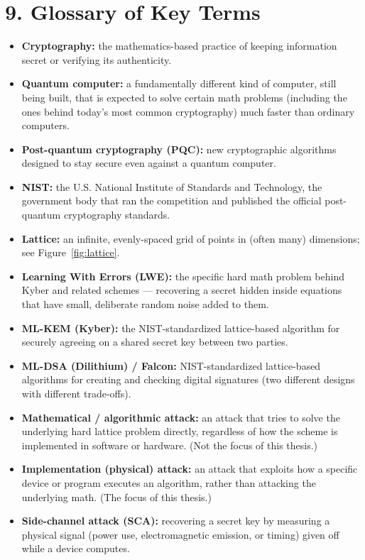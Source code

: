 \documentclass[11pt,a4paper]{article}
\begin{document}
\section*{9. Glossary of Key Terms}
\begin{itemize}[leftmargin=*]
  \item \textbf{Cryptography:} the mathematics-based practice of keeping information secret or verifying its authenticity.
  \item \textbf{Quantum computer:} a fundamentally different kind of computer, still being built, that is expected to solve certain math problems (including the ones behind today's most common cryptography) much faster than ordinary computers.
  \item \textbf{Post-quantum cryptography (PQC):} new cryptographic algorithms designed to stay secure even against a quantum computer.
  \item \textbf{NIST:} the U.S. National Institute of Standards and Technology, the government body that ran the competition and published the official post-quantum cryptography standards.
  \item \textbf{Lattice:} an infinite, evenly-spaced grid of points in (often many) dimensions; see Figure~\ref{fig:lattice}.
  \item \textbf{Learning With Errors (LWE):} the specific hard math problem behind Kyber and related schemes --- recovering a secret hidden inside equations that have small, deliberate random noise added to them.
  \item \textbf{ML-KEM (Kyber):} the NIST-standardized lattice-based algorithm for securely agreeing on a shared secret key between two parties.
  \item \textbf{ML-DSA (Dilithium) / Falcon:} NIST-standardized lattice-based algorithms for creating and checking digital signatures (two different designs with different trade-offs).
  \item \textbf{Mathematical / algorithmic attack:} an attack that tries to solve the underlying hard lattice problem directly, regardless of how the scheme is implemented in software or hardware. (Not the focus of this thesis.)
  \item \textbf{Implementation (physical) attack:} an attack that exploits how a specific device or program executes an algorithm, rather than attacking the underlying math. (The focus of this thesis.)
  \item \textbf{Side-channel attack (SCA):} recovering a secret key by measuring a physical signal (power use, electromagnetic emission, or timing) given off while a device computes.

\end{itemize}
\end{document}
